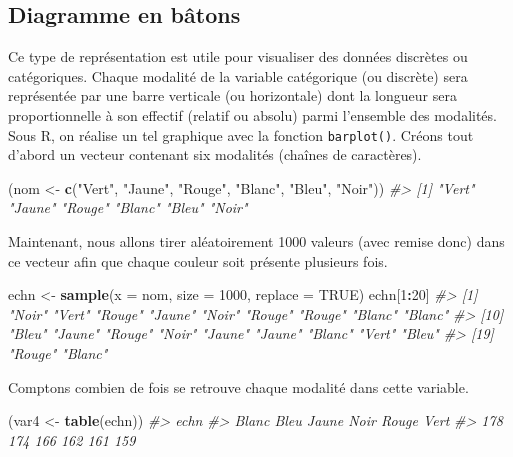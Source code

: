 \documentclass[]{article}
\newenvironment{Shaded}{\begin{snugshade}}{\end{snugshade}}
\newcommand{\CommentTok}[1]{\textcolor[rgb]{0.56,0.35,0.01}{\textit{#1}}}
\newcommand{\DataTypeTok}[1]{\textcolor[rgb]{0.13,0.29,0.53}{#1}}
\newcommand{\DecValTok}[1]{\textcolor[rgb]{0.00,0.00,0.81}{#1}}
\newcommand{\KeywordTok}[1]{\textcolor[rgb]{0.13,0.29,0.53}{\textbf{#1}}}
\newcommand{\NormalTok}[1]{#1}
\newcommand{\OperatorTok}[1]{\textcolor[rgb]{0.81,0.36,0.00}{\textbf{#1}}}
\newcommand{\OtherTok}[1]{\textcolor[rgb]{0.56,0.35,0.01}{#1}}
\newcommand{\StringTok}[1]{\textcolor[rgb]{0.31,0.60,0.02}{#1}}
\begin{document}
\hypertarget{diagramme-en-buxe2tons}{%
\subsection{Diagramme en bâtons}\label{diagramme-en-buxe2tons}}

Ce type de représentation est utile pour visualiser des données discrètes ou catégoriques. Chaque modalité de la variable catégorique (ou discrète) sera représentée par une barre verticale (ou horizontale) dont la longueur sera proportionnelle à son effectif (relatif ou absolu) parmi l'ensemble des modalités. Sous R, on réalise un tel graphique avec la fonction \texttt{barplot()}.
Créons tout d'abord un vecteur contenant six modalités (chaînes de caractères).

\begin{Shaded}
\begin{Highlighting}[]
\NormalTok{(nom <-}\StringTok{ }\KeywordTok{c}\NormalTok{(}\StringTok{"Vert"}\NormalTok{, }\StringTok{"Jaune"}\NormalTok{, }\StringTok{"Rouge"}\NormalTok{, }\StringTok{"Blanc"}\NormalTok{, }\StringTok{"Bleu"}\NormalTok{, }\StringTok{"Noir"}\NormalTok{))}
\CommentTok{#> [1] "Vert"  "Jaune" "Rouge" "Blanc" "Bleu"  "Noir"}
\end{Highlighting}
\end{Shaded}

Maintenant, nous allons tirer aléatoirement 1000 valeurs (avec remise donc) dans ce vecteur afin que chaque couleur soit présente plusieurs fois.

\begin{Shaded}
\begin{Highlighting}[]
\NormalTok{echn <-}\StringTok{ }\KeywordTok{sample}\NormalTok{(}\DataTypeTok{x =}\NormalTok{ nom, }\DataTypeTok{size =} \DecValTok{1000}\NormalTok{, }\DataTypeTok{replace =} \OtherTok{TRUE}\NormalTok{)}
\NormalTok{echn[}\DecValTok{1}\OperatorTok{:}\DecValTok{20}\NormalTok{]}
\CommentTok{#>  [1] "Noir"  "Vert"  "Rouge" "Jaune" "Noir"  "Rouge" "Rouge" "Blanc" "Blanc"}
\CommentTok{#> [10] "Bleu"  "Jaune" "Rouge" "Noir"  "Jaune" "Jaune" "Blanc" "Vert"  "Bleu" }
\CommentTok{#> [19] "Rouge" "Blanc"}
\end{Highlighting}
\end{Shaded}

Comptons combien de fois se retrouve chaque modalité dans cette variable.

\begin{Shaded}
\begin{Highlighting}[]
\NormalTok{(var4 <-}\StringTok{ }\KeywordTok{table}\NormalTok{(echn))}
\CommentTok{#> echn}
\CommentTok{#> Blanc  Bleu Jaune  Noir Rouge  Vert }
\CommentTok{#>   178   174   166   162   161   159}
\end{Highlighting}
\end{Shaded}
\end{document}
